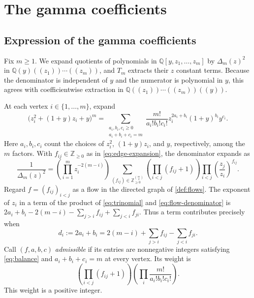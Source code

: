 \documentclass[reqno, 12pt]{article}
\numberwithin{equation}{section}
\theoremstyle{definition}
\newcommand{\NN}{\mathbb Z_{\geq0}}
\begin{document}
\section{The gamma coefficients}\label{sec:gamma}

\subsection{Expression of the gamma coefficients}

Fix $m\geq1$.  We expand quotients of polynomials in
$\mathbb Q[y,z_1,\ldots,z_m]$ by $\Delta_m(z)^2$ in $\mathbb Q(y)((z_1))\cdots((z_m))$, and $T_m$ extracts their
$z$ constant terms.  Because the denominator is independent of
$y$ and the numerator is polynomial in $y$, this agrees with
coefficientwise extraction in
$\mathbb Q((z_1))\cdots((z_m))((y))$.

At each vertex $i\in\{1,\ldots,m\}$, expand
\begin{equation}\label{eq:trinomial}
\bigl(z_i^2+(1+y)z_i+y\bigr)^m
=\sum_{\substack{a_i,b_i,c_i\geq0\\a_i+b_i+c_i=m}}
\frac{m!}{a_i!b_i!c_i!}
z_i^{2a_i+b_i}(1+y)^{b_i}y^{c_i}.
\end{equation}
Here $a_i,b_i,c_i$ count the choices of $z_i^2$, $(1+y)z_i$,
and $y$, respectively, among the $m$ factors. With $f_{ij}\in\NN$ as in
\eqref{eq:edge-expansion}, the denominator expands as
\begin{equation}\label{eq:flow-denominator}
\frac1{\Delta_m(z)^2}
=\left(\prod_{i=1}^m z_i^{-2(m-i)}\right)
\sum_{(f_{ij})\in\NN^{\binom m2}}
\left(\prod_{i<j}(f_{ij}+1)\right)
\prod_{i<j}\left(\frac{z_j}{z_i}\right)^{f_{ij}}.
\end{equation}
Regard $f=(f_{ij})_{i<j}$ as a flow in the directed graph of \cref{def:flows}.  The exponent of $z_i$ in a term
of the product of \eqref{eq:trinomial} and
\eqref{eq:flow-denominator} is
$2a_i+b_i-2(m-i)-\sum_{j>i}f_{ij}+\sum_{j<i}f_{ji}$.
Thus a term contributes precisely when
\begin{equation}\label{eq:balance}
d_i:=2a_i+b_i
=2(m-i)+\sum_{j>i}f_{ij}-\sum_{j<i}f_{ji}.
\end{equation}
Call $(f,a,b,c)$ \emph{admissible} if its entries are
nonnegative integers satisfying \eqref{eq:balance} and
$a_i+b_i+c_i=m$ at every vertex.  Its weight is
\[
 \left(\prod_{i<j}(f_{ij}+1)\right)
 \left(\prod_i\frac{m!}{a_i!b_i!c_i!}\right).
\]
This weight is a positive integer.
\end{document}
